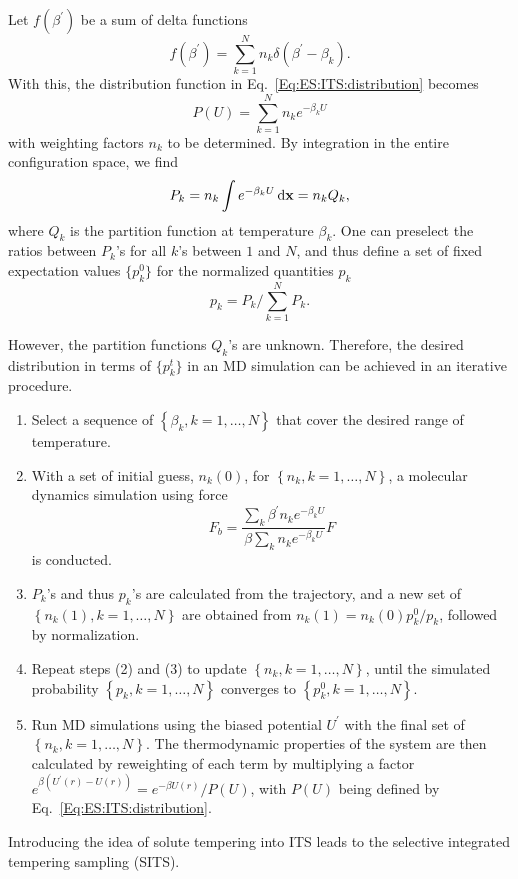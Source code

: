 Let $f(\beta^\prime)$ be a sum of delta functions
\begin{equation}
	f\left(\beta^{\prime}\right)=\sum_{k=1}^N n_k \delta\left(\beta^{\prime}-\beta_k\right) .
\end{equation}
With this, the distribution function in Eq.~\ref{Eq:ES:ITS:distribution} becomes
\begin{equation}
	P(U)=\sum_{k=1}^N n_k  e^{-\beta_k U}
\end{equation}
with weighting factors $n_k$ to be determined. By integration in  the entire configuration space, we find
\begin{equation}
	P_k= n_k \int e^{-\beta_k  U}\mathop{}\!\mathrm{d} \mathbf{x}= n_k Q_k,
\end{equation}
where $Q_k$ is the partition function at temperature $\beta_k$. One can preselect the ratios between $P_k$'s for all $k$'s between $1$ and $N$, and thus define a set of fixed expectation values $\{p_k^0\}$ for the normalized quantities $p_k$
\begin{equation}
	p_k=P_k/\sum_{k=1}^N P_k.
\end{equation}

However, the partition functions $Q_k$'s are unknown. Therefore, the desired distribution in terms of $\{p_k^t\}$ in an MD simulation can be achieved in an iterative procedure.
\begin{enumerate}
	\item Select a sequence of $\left\{\beta_k, k=1, \dots, N\right\}$ that cover the desired range of temperature.
	\item With a set of initial guess, $n_k(0)$, for $\left\{n_k, k=1, \dots, N\right\}$, a molecular dynamics simulation using force
	$$
	F_b=\frac{\sum_k \beta^{\prime} n_k e^{-\beta_k U}}{\beta \sum_k n_k e^{-\beta_k U}} F
	$$
	is conducted.
	\item $P_k$'s and thus $p_k$'s are calculated from the trajectory, and a new set of $\left\{n_k(1), k=1, \dots, N\right\}$ are obtained from $n_k(1)=n_k(0) p_k^0 / p_k$, followed by normalization.
	\item Repeat steps (2) and (3) to update $\left\{n_k, k=1, \dots, N\right\}$, until the simulated probability $\left\{p_k, k=1, \dots, N\right\}$ converges to $\left\{p_k^0, k=1, \dots, N\right\}$.
	\item Run MD simulations using the biased potential $U^\prime$ with the final set of $\left\{n_k, k=1, \dots, N\right\}$. The thermodynamic properties of the system are then calculated by reweighting of each term by multiplying a factor $e^{\beta\left(U^{\prime}(r)-U(r)\right)}=e^{-\beta U(r)} / P(U)$, with $P(U)$ being defined by Eq.~\ref{Eq:ES:ITS:distribution}.
\end{enumerate}

Introducing the idea of solute tempering into ITS leads to the selective integrated tempering sampling (SITS).\cite{YangJCP2009}